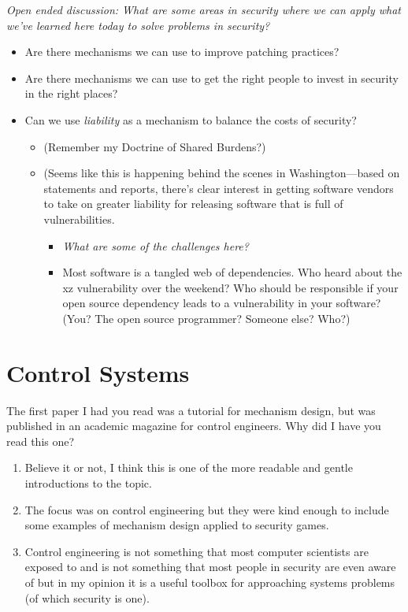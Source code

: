 \documentclass[11pt]{article}
\begin{document}
{\it Open ended discussion: What are some areas in security where we can apply what we've learned here today to solve problems in security?}
\begin{itemize}
    \item Are there mechanisms we can use to improve patching practices?
    \item Are there mechanisms we can use to get the right people to invest in security in the right places?
    \item Can we use {\it liability} as a mechanism to balance the costs of security?
    \begin{itemize}
        \item (Remember my Doctrine of Shared Burdens?)
        \item (Seems like this is happening behind the scenes in Washington---based on statements and reports, there's clear interest in getting software vendors to take on greater liability for releasing software that is full of vulnerabilities. 
        \begin{itemize}
            \item {\it What are some of the challenges here?}
            \item Most software is a tangled web of dependencies. Who heard about the xz vulnerability over the weekend? Who should be responsible if your open source dependency leads to a vulnerability in your software? (You? The open source programmer? Someone else? Who?)
        \end{itemize}
    \end{itemize}
\end{itemize}

\section{Control Systems}

The first paper I had you read was a tutorial for mechanism design, but was published in an academic magazine for control engineers. Why did I have you read this one?
\begin{enumerate}
    \item Believe it or not, I think this is one of the more readable and gentle introductions to the topic.
    \item The focus was on control engineering but they were kind enough to include some examples of mechanism design applied to security games.
    \item Control engineering is not something that most computer scientists are exposed to and is not something that most people in security are even aware of but in my opinion it is a useful toolbox for approaching systems problems (of which security is one).
\end{enumerate}
\end{document}
